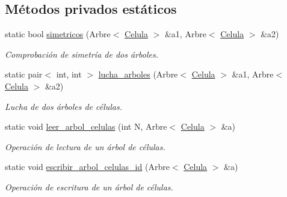 \subsection*{\-Métodos privados estáticos}
\begin{DoxyCompactItemize}
\item 
static bool \hyperlink{class_organismo_ac483b268b68eed06f612ed690c22af8f}{simetricos} (\-Arbre$<$ \hyperlink{class_celula}{\-Celula} $>$ \&a1, \-Arbre$<$ \hyperlink{class_celula}{\-Celula} $>$ \&a2)
\begin{DoxyCompactList}\small\item\em \-Comprobación de simetría de dos árboles. \end{DoxyCompactList}\item 
static pair$<$ int, int $>$ \hyperlink{class_organismo_aaf643a47840f855ed3e105970f75a078}{lucha\-\_\-arboles} (\-Arbre$<$ \hyperlink{class_celula}{\-Celula} $>$ \&a1, \-Arbre$<$ \hyperlink{class_celula}{\-Celula} $>$ \&a2)
\begin{DoxyCompactList}\small\item\em \-Lucha de dos árboles de células. \end{DoxyCompactList}\item 
static void \hyperlink{class_organismo_abf016c166b00ca0f7016afd44d282913}{leer\-\_\-arbol\-\_\-celulas} (int \-N, \-Arbre$<$ \hyperlink{class_celula}{\-Celula} $>$ \&a)
\begin{DoxyCompactList}\small\item\em \-Operación de lectura de un árbol de células. \end{DoxyCompactList}\item 
static void \hyperlink{class_organismo_ad29f7f44a5694136d0a3990581426cf0}{escribir\-\_\-arbol\-\_\-celulas\-\_\-id} (\-Arbre$<$ \hyperlink{class_celula}{\-Celula} $>$ \&a)
\begin{DoxyCompactList}\small\item\em \-Operación de escritura de un árbol de células. \end{DoxyCompactList}\end{DoxyCompactItemize}
